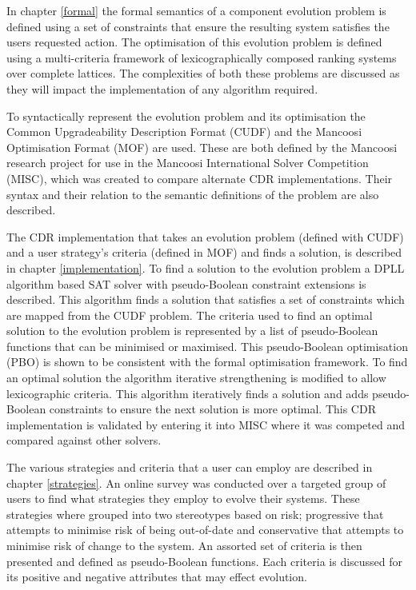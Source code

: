 In chapter \ref{formal} the formal semantics of a component evolution problem is defined using a set of constraints that ensure the resulting system satisfies the users requested action.
The optimisation of this evolution problem is defined using a multi-criteria framework of lexicographically composed ranking systems over complete lattices.
The complexities of both these problems are discussed as they will impact the implementation of any algorithm required.

To syntactically represent the evolution problem and its optimisation the Common Upgradeability Description Format (CUDF) and the Mancoosi Optimisation Format (MOF) are used.
These are both defined by the Mancoosi research project for use in the Mancoosi International Solver Competition (MISC), 
which was created to compare alternate CDR implementations.
Their syntax and their relation to the semantic definitions of the problem are also described.

The CDR implementation that takes an evolution problem (defined with CUDF) and a user strategy's criteria (defined in MOF) and finds a solution, is described in chapter \ref{implementation}.
To find a solution to the evolution problem a DPLL algorithm based SAT solver with pseudo-Boolean constraint extensions is described.
This algorithm finds a solution that satisfies a set of constraints which are mapped from the CUDF problem.
The criteria used to find an optimal solution to the evolution problem is represented by a list of pseudo-Boolean functions that can be minimised or maximised.
This pseudo-Boolean optimisation (PBO) is shown to be consistent with the formal optimisation framework.
To find an optimal solution the algorithm iterative strengthening is modified to allow lexicographic criteria.
This algorithm iteratively finds a solution and adds pseudo-Boolean constraints to ensure the next solution is more optimal.
This CDR implementation is validated by entering it into MISC where it was competed and compared against other solvers.

The various strategies and criteria that a user can employ are described in chapter \ref{strategies}.
An online survey was conducted over a targeted group of users to find what strategies they employ to evolve their systems.
These strategies where grouped into two stereotypes based on risk;
progressive that attempts to minimise risk of being out-of-date
and conservative that attempts to minimise risk of change to the system.
An assorted set of criteria is then presented and defined as pseudo-Boolean functions.
Each criteria is discussed for its positive and negative attributes that may effect evolution.

